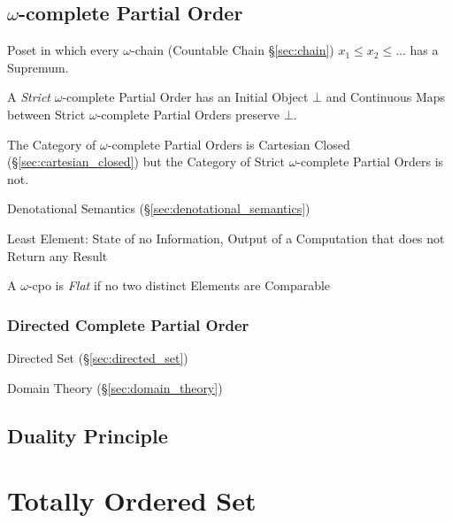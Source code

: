\subsection{$\omega$-complete Partial Order}\label{sec:omega_cpo}

Poset in which every $\omega$-chain (Countable Chain
\S\ref{sec:chain}) $x_1 \leq x_2 \leq \ldots$ has a Supremum.

A \emph{Strict} $\omega$-complete Partial Order has an Initial Object
$\bot$ and Continuous Maps between Strict $\omega$-complete Partial
Orders preserve $\bot$.

The Category of $\omega$-complete Partial Orders is Cartesian Closed
(\S\ref{sec:cartesian_closed}) but the Category of Strict
$\omega$-complete Partial Orders is not.

Denotational Semantics (\S\ref{sec:denotational_semantics})

Least Element: State of no Information, Output of a Computation that
does not Return any Result

A $\omega$-cpo is \emph{Flat} if no two distinct Elements are
Comparable



\subsubsection{Directed Complete Partial Order}\label{sec:dcpo}

Directed Set (\S\ref{sec:directed_set})

Domain Theory (\S\ref{sec:domain_theory})



\subsection{Duality Principle}\label{sec:duality_principle}



\section{Totally Ordered Set}\label{sec:totally_ordered}

